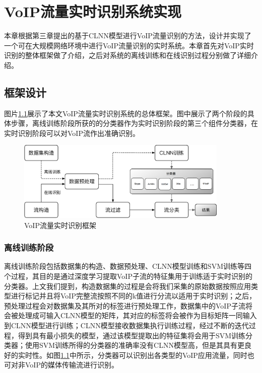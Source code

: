 \chapter{VoIP流量实时识别系统实现}
本章根据第三章提出的基于CLNN模型进行VoIP流量识别的方法，设计并实现了一个可在大规模网络环境中进行VoIP流量识别的实时系统。本章首先对VoIP实时识别的整体框架做了介绍，之后对系统的离线训练和在线识别过程分别做了详细介绍。

\section{框架设计}
图片\ref{fig:architecture}展示了本文VoIP流量实时识别系统的总体框架。图中展示了两个阶段的具体步骤，离线训练阶段所获的的分类器作为实时识别阶段的第三个组件分类器，在实时识别阶段可以对VoIP流作出准确识别。
\begin{figure}[thb]
\centering
\includegraphics[width=0.9\textwidth]{figures/architecture.eps}
\caption{VoIP流量实时识别框架}
\label{fig:architecture}
\end{figure}

\subsection{离线训练阶段}
离线训练阶段包括数据集的构造、数据预处理、CLNN模型训练和SVM训练等四个过程，其目的是通过深度学习提取VoIP子流的特征集用于训练适于实时识别的分类器。上文我们提到，构造数据集的过程是会将我们采集的原始数据按照应用类型进行标记并且将VoIP完整流按照不同的k值进行分流以适用于实时识别；之后，预处理过程会对数据集及其所对的标签进行预处理工作，数据集中的VoIP子流将会被处理成可输入CLNN模型的矩阵，其对应的标签将会被作为目标矩阵一同输入到CLNN模型进行训练；CLNN模型接收数据集执行训练过程，经过不断的迭代过程，得到具有最小损失的模型，通过该模型提取出的特征集将会用于SVM训练分类器；使用SVM训练所得的分类器的准确率没有CLNN模型高，但是其具有更良好的实时性。如图\ref{fig:architecture}中所示，分类器可以识别出各类型的VoIP应用流量，同时也可对非VoIP的媒体传输流进行识别。

